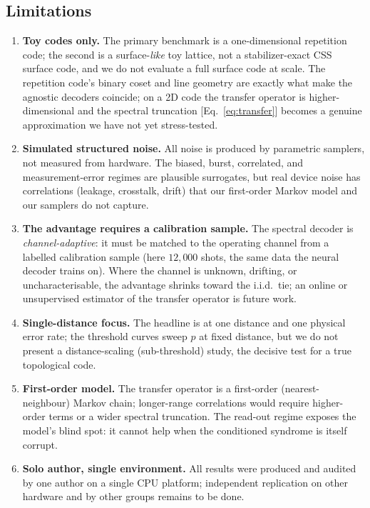 \documentclass[reprint,aps,prxquantum,amsmath,amssymb,floatfix,nofootinbib,longbibliography]{revtex4-2}
\theoremstyle{definition}
\theoremstyle{remark}
\theoremstyle{plain}
\newcommand{\sync}[1]{#1}
\begin{document}
\subsection{Limitations}
\label{sec:limitations}
\begin{enumerate}[leftmargin=1.5em]
    \item \textbf{Toy codes only.} The primary benchmark is a one-dimensional repetition code; the second is a surface-\emph{like} toy lattice, not a stabilizer-exact CSS surface code, and we do not evaluate a full surface code at scale. The repetition code's binary coset and line geometry are exactly what make the agnostic decoders coincide; on a 2D code the transfer operator is higher-dimensional and the spectral truncation [Eq.~\eqref{eq:transfer}] becomes a genuine approximation we have not yet stress-tested.
    \item \textbf{Simulated structured noise.} All noise is produced by parametric samplers, not measured from hardware. The biased, burst, correlated, and measurement-error regimes are plausible surrogates, but real device noise has correlations (leakage, crosstalk, drift) that our first-order Markov model and our samplers do not capture.
    \item \textbf{The advantage requires a calibration sample.} The spectral decoder is \emph{channel-adaptive}: it must be matched to the operating channel from a labelled calibration sample (here $\sync{12{,}000}$ shots, the same data the neural decoder trains on). Where the channel is unknown, drifting, or uncharacterisable, the advantage shrinks toward the i.i.d.\ tie; an online or unsupervised estimator of the transfer operator is future work.
    \item \textbf{Single-distance focus.} The headline is at one distance and one physical error rate; the threshold curves sweep $p$ at fixed distance, but we do not present a distance-scaling (sub-threshold) study, the decisive test for a true topological code.
    \item \textbf{First-order model.} The transfer operator is a first-order (nearest-neighbour) Markov chain; longer-range correlations would require higher-order terms or a wider spectral truncation. The read-out regime exposes the model's blind spot: it cannot help when the conditioned syndrome is itself corrupt.
    \item \textbf{Solo author, single environment.} All results were produced and audited by one author on a single CPU platform; independent replication on other hardware and by other groups remains to be done.
\end{enumerate}
\end{document}
